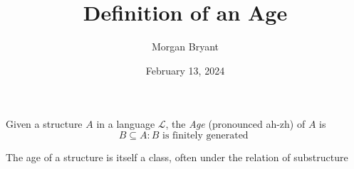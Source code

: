 \documentclass[a4paper]{article}
\title{Definition of an Age}
\date{February 13, 2024}
\author{Morgan Bryant}
\begin{document}
\maketitle
\par{Given a structure \(A\) in a language \(\mathcal {L}\), the \emph{Age} (pronounced ah-zh) of \(A\) is \[B \subseteq  A: B  \text { is finitely generated }\]}\par{The age of a structure is itself a class, often under the relation of substructure}
\printbibliography
\end{document}

